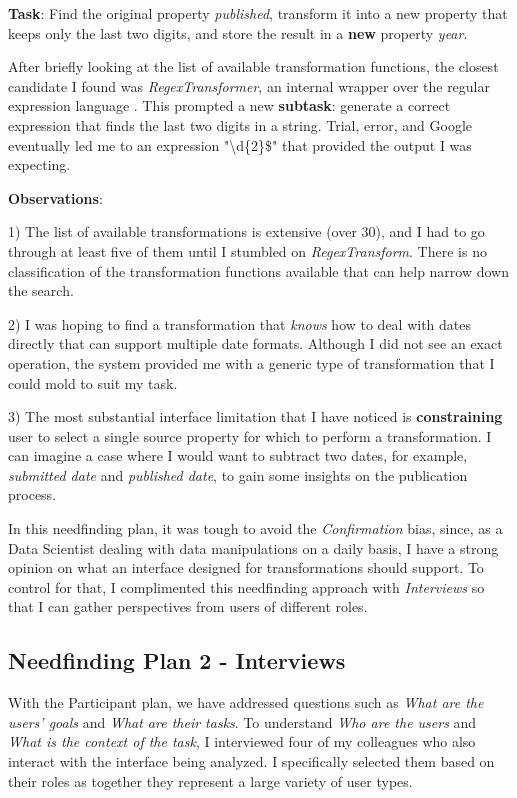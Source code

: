 \documentclass[12pt,letterpaper]{article}
\begin{document}
\textbf{Task}: Find the original property \textit{published}, transform it into a new property that keeps only the last two digits, and store the result in a \textbf{new} property \textit{year}.

After briefly looking at the list of available transformation functions, the closest candidate I found was \textit{RegexTransformer}, an internal wrapper over the regular expression language \cite{wiki:regex}. This prompted a new \textbf{subtask}: generate a correct expression that finds the last two digits in a string. Trial, error, and Google eventually led me to an expression "{\textbackslash{d}\{2\}\$}" that provided the output I was expecting.

\textbf{Observations}:

1) The list of available transformations is extensive (over 30), and I had to go through at least five of them until I stumbled on \textit{RegexTransform}. There is no classification of the transformation functions available that can help narrow down the search.

2) I was hoping to find a transformation that \textit{knows} how to deal with dates directly that can support multiple date formats. Although I did not see an exact operation, the system provided me with a generic type of transformation that I could mold to suit my task.

3) The most substantial interface limitation that I have noticed is \textbf{constraining} user to select a single source property for which to perform a transformation. I can imagine a case where I would want to subtract two dates, for example, \textit{submitted date} and \textit{published date}, to gain some insights on the publication process.

In this needfinding plan, it was tough to avoid the \textit{Confirmation} bias, since, as a Data Scientist dealing with data manipulations on a daily basis, I have a strong opinion on what an interface designed for transformations should support. To control for that, I complimented this needfinding approach with \textit{Interviews} so that I can gather perspectives from users of different roles. 

\subsection*{Needfinding Plan 2 - Interviews}
With the Participant plan, we have addressed questions such as \textit{What are the users' goals} and \textit{What are their tasks}. To understand \textit{Who are the users} and \textit{What is the context of the task}, I interviewed four of my colleagues who also interact with the interface being analyzed. I specifically selected them based on their roles as together they represent a large variety of user types. 
\end{document}
